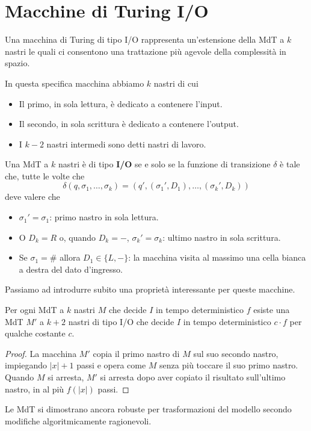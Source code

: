 \section{Macchine di Turing I/O}

Una macchina di Turing di tipo I/O rappresenta un'estensione
della MdT a $k$ nastri le quali ci consentono una trattazione
più agevole della complessità in spazio.

In questa specifica macchina abbiamo $k$ nastri di cui
\begin{itemize}
	\item Il primo, in sola lettura, è dedicato a contenere
	      l'input.
	\item Il secondo, in sola scrittura è dedicato a contenere
	      l'output.
	\item I $k-2$ nastri intermedi sono detti nastri di lavoro.
\end{itemize}

\begin{definition}
	Una MdT a $k$ nastri è di tipo \textbf{I/O} se e solo se la
	funzione di transizione $\delta$ è tale che, tutte le volte
	che
	\[
		\delta (q, \sigma_1, \dots, \sigma_k) =
		(q', (\sigma_1', D_1), \dots, (\sigma_k', D_k))
	\]
	deve valere che
	\begin{itemize}
		\item $\sigma_1' = \sigma_1$: primo nastro in sola
		      lettura.
		\item O $D_k = R$ o, quando $D_k = -$,
		      $\sigma_k' = \sigma_k$: ultimo nastro in sola
		      scrittura.
		\item Se $\sigma_1 = \#$ allora $D_1 \in \{ L, - \}$: la
		      macchina visita al massimo una cella bianca a
		      destra del dato d'ingresso.
	\end{itemize}
\end{definition}

Passiamo ad introdurre subito una proprietà interessante per
queste macchine.

\begin{property}
	Per ogni MdT a $k$ nastri $M$ che decide $I$ in tempo
	deterministico $f$ esiste una MdT $M'$ a $k+2$ nastri di
	tipo I/O che decide $I$ in tempo deterministico $c \cdot f$
	per qualche costante $c$.
	\begin{proof}
		La macchina $M'$ copia il primo nastro di $M$ sul suo
		secondo nastro, impiegando $|x| + 1$ passi e opera come
		$M$ senza più toccare il suo primo nastro. Quando $M$ si
		arresta, $M'$ si arresta dopo aver copiato il risultato
		sull'ultimo nastro, in al più $f(|x|)$ passi.
	\end{proof}
\end{property}

Le MdT si dimostrano ancora robuste per trasformazioni del
modello secondo modifiche algoritmicamente ragionevoli.